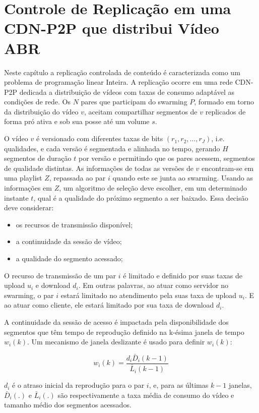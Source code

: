 \documentclass[
	12pt,				%
	oneside,			%
	a4paper,			%
	english,			%
	brazil				%
	]{abntex2ppgsi}
\begin{document}
\chapter{Controle de Replicação em uma CDN-P2P que distribui Vídeo ABR}

Neste capítulo a replicação controlada de conteúdo é caracterizada como um problema de programação linear Inteira. A replicação ocorre em uma rede CDN-P2P dedicada a distribuição de vídeos com taxas de consumo adaptável as condições de rede. Os $N$ pares que participam do swarming $P$, formado em torno da distribuição do vídeo $v$, aceitam compartilhar segmentos de $v$ replicados de forma pró ativa e sob sua posse até um volume $s$.

O vídeo $v$ é versionado com diferentes taxas de bits $(r_1,r_2,\ldots,r_J)$, i.e. qualidades, e cada versão é segmentada e alinhada no tempo, gerando $H$ segmentos de duração $t$ por versão e permitindo que os pares acessem, segmentos de qualidade distintas. As informações de todas as versões de $v$ encontram-se em uma playlist $Z$, repassada ao par $i$ quando este se junta ao swarming. Usando as informações em $Z$, um algoritmo de seleção deve escolher, em um determinado instante $t$, qual é a qualidade do próximo segmento a ser baixado. Essa decisão deve considerar:
\begin{itemize}
\item os recursos de transmissão disponível;
\item a continuidade da sessão de vídeo;
\item a qualidade do segmento acessado;
\end{itemize} 

O recurso de transmissão de um par $i$ é limitado e definido por suas taxas de upload $u_i$ e download $d_i$. Em outras palavras, ao atuar como servidor no swarming, o par $i$ estará limitado no atendimento pela suas taxa de upload $u_i$. E ao atuar como cliente, ele estará limitado por sua taxa de download $d_i$.

A continuidade da sessão de acesso é impactada pela disponibilidade dos segmentos que têm tempo de reprodução definido na k-ésima janela de tempo $w_i(k)$. Um mecanismo de janela deslizante é usado para definir $w_i(k)$:

\begin{equation}
w_i(k) = \frac{d_i\bar{D}_i(k-1)}{\bar{L}_i(k-1)} 
\end{equation}

\noindent $d_i$ é o atraso inicial da reprodução para o par $i$, e, para as últimas $k-1$ janelas, $\bar{D}_i(.)$ e $\bar{L}_i(.)$ são respectivamente a taxa média de consumo do vídeo e tamanho médio dos segmentos acessados.
\end{document}
